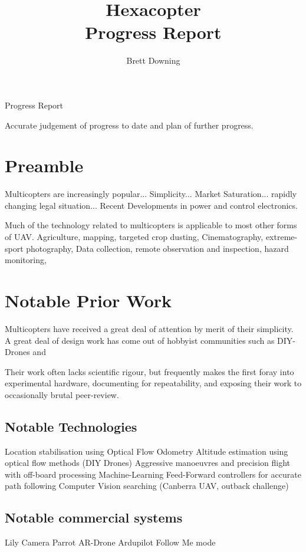 \documentclass[11pt]{article}
\title{Hexacopter\\
	Progress Report}
\author{Brett Downing}
\date{}
\begin{document}
  \maketitle

  Progress Report
  
  Accurate judgement of progress to date and plan of further progress.

  \section{Preamble}
    Multicopters are increasingly popular... Simplicity... Market Saturation... rapidly changing legal situation... 
    Recent Developments in power and control electronics.

    Much of the technology related to multicopters is applicable to most other forms of UAV.
    Agriculture, mapping, targeted crop dusting, Cinematography, extreme-sport photography, Data collection, remote observation and inspection, hazard monitoring,


  \section{Notable Prior Work}
    Multicopters have received a great deal of attention by merit of their simplicity. A great deal of design work has come out of hobbyist communities such as DIY-Drones and
    
    Their work often lacks scientific rigour, but frequently makes the first foray into experimental hardware, documenting for repeatability, and exposing their work to occasionally brutal peer-review.

    \subsection{Notable Technologies}
    Location stabilisation using Optical Flow Odometry
    Altitude estimation using optical flow methods (DIY Drones)
    Aggressive manoeuvres and precision flight with off-board processing
    Machine-Learning Feed-Forward controllers for accurate path following
    Computer Vision searching (Canberra UAV, outback challenge)


    \subsection{Notable commercial systems}
    Lily Camera
    Parrot AR-Drone
    Ardupilot Follow Me mode
\end{document}
